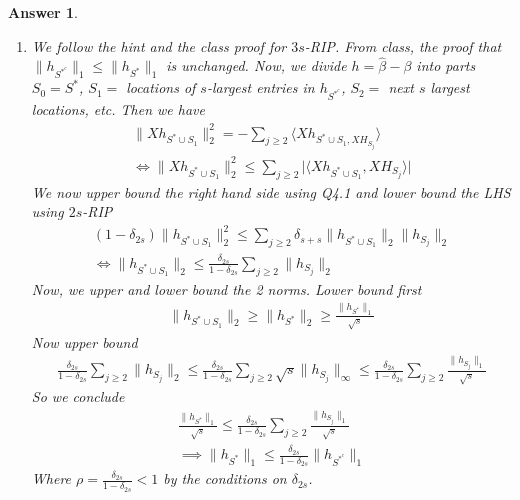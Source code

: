 \documentclass[12pt]{article}
\theoremstyle{colon}
\newtheorem*{answer}{Answer}
\begin{document}
\begin{answer}
\begin{enumerate}[label=\arabic*)]
    \item We follow the hint and the class proof for $3s$-RIP. From class, the proof that $\lVert h_{S^{*^c}} \rVert_1 \leq \lVert h_{S^*} \rVert_1$ is unchanged. Now, we divide $h = \hat{\beta} - \beta$ into parts $S_0 = S^*$, $S_1 = $ locations of $s$-largest entries in $h_{S^{*^c}}$, $S_2 = $ next $s$ largest locations, etc. Then we have
      \begin{gather*}
        \lVert X h_{S^* \cup S_1} \rVert_2^2 = - \sum_{j \geq 2} \langle X h_{S^* \cup S_1, X H_{S_j}} \rangle \\
        \Longleftrightarrow \lVert X h_{S^* \cup S_1} \rVert_2^2 \leq \sum_{j \geq 2} \lvert \langle X h_{S^* \cup S_1}, X H_{S_j} \rangle \rvert
      \end{gather*}
      We now upper bound the right hand side using Q4.1 and lower bound the LHS using $2s$-RIP
      \begin{gather*}
        (1-\delta_{2s}) \lVert h_{S^* \cup S_1} \rVert_2^2 \leq \sum_{j \geq 2} \delta_{s+s} \lVert h_{S^* \cup S_1} \rVert_2 \lVert h_{S_j} \rVert_2 \\
        \Longleftrightarrow \lVert h_{S^* \cup S_1} \rVert_2 \leq \frac{\delta_{2s}}{1-\delta_{2s}} \sum_{j \geq 2} \lVert h_{S_j} \rVert_2
      \end{gather*}
      Now, we upper and lower bound the 2 norms. Lower bound first
      \begin{gather*}
        \lVert h_{S^* \cup S_1} \rVert_2 \geq \lVert h_{S^*} \rVert_2 \geq \frac{\lVert h_{S^*} \rVert_1}{\sqrt{s}}
      \end{gather*}
      Now upper bound
      \begin{gather*}
         \frac{\delta_{2s}}{1-\delta_{2s}} \sum_{j \geq 2} \lVert h_{S_j} \rVert_2 \leq \frac{\delta_{2s}}{1-\delta_{2s}} \sum_{j \geq 2} \sqrt{s} \lVert h_{S_j} \rVert_\infty \leq \frac{\delta_{2s}}{1-\delta_{2s}} \sum_{j \geq 2} \frac{\lVert h_{S_j} \rVert_1}{\sqrt{s}}
      \end{gather*}
      So we conclude
      \begin{gather*}
        \frac{\lVert h_{S^*} \rVert_1}{\sqrt{s}} \leq \frac{\delta_{2s}}{1-\delta_{2s}} \sum_{j \geq 2} \frac{\lVert h_{S_j} \rVert_1}{\sqrt{s}} \\
        \implies \lVert h_{S^*} \rVert_1 \leq \frac{\delta_{2s}}{1-\delta_{2s}} \lVert h_{S^{*^c}} \rVert_1
      \end{gather*}
      Where $\rho = \frac{\delta_{2s}}{1-\delta_{2s}} < 1$ by the conditions on $\delta_{2s}$.


\end{enumerate}
\end{answer}
\end{document}
